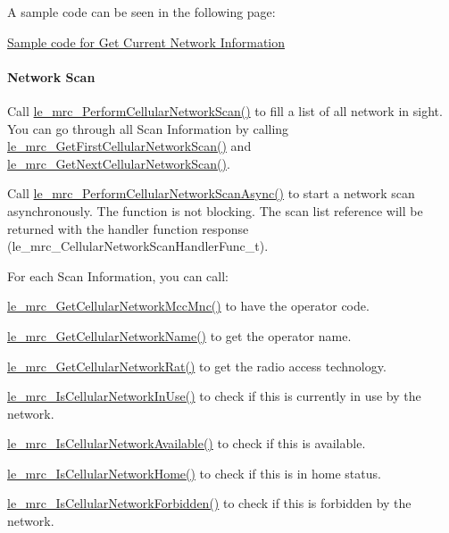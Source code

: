 A sample code can be seen in the following page\+:
\begin{DoxyItemize}
\item \hyperlink{c_mrcGetCurrentNetwork}{Sample code for Get Current Network Information}
\end{DoxyItemize}\hypertarget{c_mrc_le_mrc_networkScan}{}\paragraph{Network Scan}\label{c_mrc_le_mrc_networkScan}
Call \hyperlink{le__mrc__interface_8h_ab4a246dd466fa8175aca0158e0cab227}{le\+\_\+mrc\+\_\+\+Perform\+Cellular\+Network\+Scan()} to fill a list of all network in sight. You can go through all Scan Information by calling \hyperlink{le__mrc__interface_8h_ae006d053b037cec589aa85053472a2af}{le\+\_\+mrc\+\_\+\+Get\+First\+Cellular\+Network\+Scan()} and \hyperlink{le__mrc__interface_8h_ae0ca9f0c1c106d6ddeef784c6bb0d69b}{le\+\_\+mrc\+\_\+\+Get\+Next\+Cellular\+Network\+Scan()}.

Call \hyperlink{le__mrc__interface_8h_ab66e29d054d7902c61f87e79fd6d987f}{le\+\_\+mrc\+\_\+\+Perform\+Cellular\+Network\+Scan\+Async()} to start a network scan asynchronously. The function is not blocking. The scan list reference will be returned with the handler function response ({\ttfamily le\+\_\+mrc\+\_\+\+Cellular\+Network\+Scan\+Handler\+Func\+\_\+t}).

For each Scan Information, you can call\+:


\begin{DoxyItemize}
\item \hyperlink{le__mrc__interface_8h_aad275d839efe8b2b5eafe65ef87bd3d3}{le\+\_\+mrc\+\_\+\+Get\+Cellular\+Network\+Mcc\+Mnc()} to have the operator code.
\item \hyperlink{le__mrc__interface_8h_a6fcb9785c79cb9f8a4d1bef2484ca9d5}{le\+\_\+mrc\+\_\+\+Get\+Cellular\+Network\+Name()} to get the operator name.
\item \hyperlink{le__mrc__interface_8h_ad33fbe1d2b7acee0e47f3e54cab78274}{le\+\_\+mrc\+\_\+\+Get\+Cellular\+Network\+Rat()} to get the radio access technology.
\item \hyperlink{le__mrc__interface_8h_a4c859fc1364c183aa1d26a022db365c6}{le\+\_\+mrc\+\_\+\+Is\+Cellular\+Network\+In\+Use()} to check if this is currently in use by the network.
\item \hyperlink{le__mrc__interface_8h_a72ca8072f90d453169baff44441c41c0}{le\+\_\+mrc\+\_\+\+Is\+Cellular\+Network\+Available()} to check if this is available.
\item \hyperlink{le__mrc__interface_8h_a7333dfc638f50524f9c6fd81457828ba}{le\+\_\+mrc\+\_\+\+Is\+Cellular\+Network\+Home()} to check if this is in home status.
\item \hyperlink{le__mrc__interface_8h_a699a52d014550124a5b3362ee888a780}{le\+\_\+mrc\+\_\+\+Is\+Cellular\+Network\+Forbidden()} to check if this is forbidden by the network.
\end{DoxyItemize}


